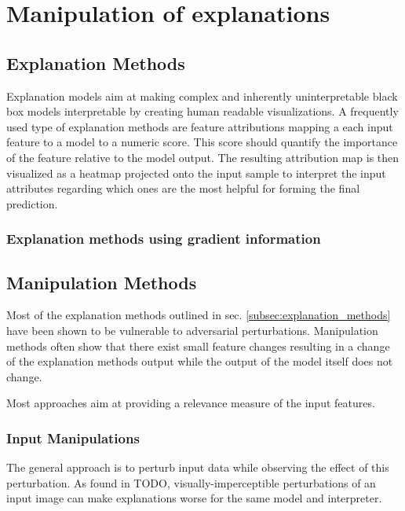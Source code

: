 \section{Manipulation of explanations}

\subsection{Explanation Methods}
\label{subsec:explanation_methods}
Explanation models aim at making complex and inherently uninterpretable black box models interpretable by creating human readable visualizations. 
A frequently used type of explanation methods are feature attributions mapping a each input feature to a model to a numeric score. This score should quantify the importance of the feature relative to the model output. The resulting attribution map is then visualized as a heatmap projected onto the input sample to interpret the input attributes regarding which ones are the most helpful for forming the final prediction. 



\subsubsection{Explanation methods using gradient information}





\subsection{Manipulation Methods}
\label{subsec:manipulation_methods}
Most of the explanation methods outlined in sec. \autoref{subsec:explanation_methods} have been shown to be vulnerable to adversarial perturbations. 
Manipulation methods often show that there exist small feature changes resulting in a change of the explanation methods output while the output of the model itself does not change. 




Most approaches aim at providing a relevance measure of the input features. 


\subsubsection{Input Manipulations}
\label{subsec:input_manipuls}

The general approach is to perturb input data while observing the effect of this perturbation. As found in TODO, visually-imperceptible perturbations of an input image can make explanations worse for the same model and interpreter. 




